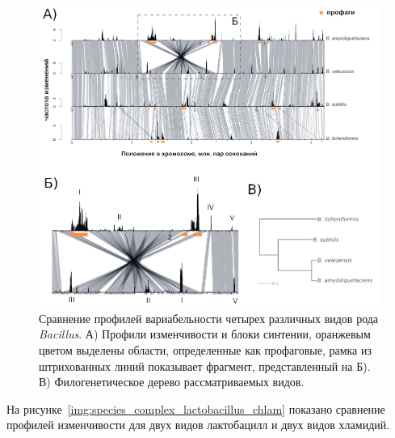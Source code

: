 \begin{figure}[!ht] 
  \center
    \includegraphics[width=\textwidth]{Dissertation/images/complexity/bacillus_compare_v3.png}
  \caption{Сравнение профилей вариабельности четырех различных видов рода \textit{Bacillus}. А) Профили изменчивости и блоки синтении, оранжевым цветом выделены области, определенные как профаговые, рамка из штрихованных линий показывает фрагмент, представленный на Б). В) Филогенетическое дерево рассматриваемых видов.}
  \label{img:species_complex_bacillus} 
\end{figure}

На рисунке~\ref{img:species_complex_lactobacillus_chlam} показано сравнение профилей изменчивости для двух видов лактобацилл и двух видов хламидий.

